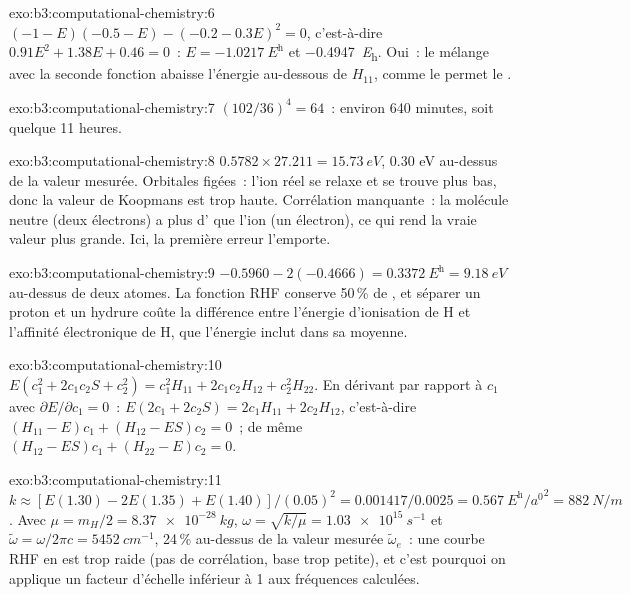 \begin{solution}{exo:b3:computational-chemistry:6}
$(-1 - E)(-0.5 - E) - (-0.2 - 0.3E)^2 = 0$, c'est-à-dire $0.91E^2 + 1.38E + 0.46 = 0$~:
$E = \qty{-1.0217}{\hartree}$ et \qty{-0.4947}{\hartree}. Oui~: le
mélange avec la seconde fonction abaisse l'énergie au-dessous de
$H_{11}$, comme le permet le .
\end{solution}

\begin{solution}{exo:b3:computational-chemistry:7}
$(102/36)^4 = 64$~: environ 640 minutes, soit quelque 11 heures.
\end{solution}

\begin{solution}{exo:b3:computational-chemistry:8}
$0.5782 \times 27.211 = \qty{15.73}{eV}$, 0.30 eV au-dessus de la valeur
mesurée. Orbitales figées~: l'ion réel se relaxe et se trouve plus bas,
donc la valeur de Koopmans est trop haute. Corrélation manquante~: la
molécule neutre (deux électrons) a plus d' que
l'ion (un électron), ce qui rend la vraie valeur plus grande. Ici, la
première erreur l'emporte.
\end{solution}

\begin{solution}{exo:b3:computational-chemistry:9}
$-0.5960 - 2(-0.4666) = \qty{0.3372}{\hartree} = \qty{9.18}{eV}$ au-dessus
de deux atomes. La fonction RHF conserve 50\,\% de , et séparer
un proton et un hydrure coûte la différence entre l'énergie d'ionisation
de H et l'affinité électronique de H, que l'énergie inclut dans sa
moyenne.
\end{solution}

\begin{solution}{exo:b3:computational-chemistry:10}
$E(c_1^2 + 2c_1c_2S + c_2^2) = c_1^2H_{11} + 2c_1c_2H_{12} + c_2^2H_{22}$.
En dérivant par rapport à $c_1$ avec $\partial E/\partial c_1 = 0$~:
$E(2c_1 + 2c_2S) = 2c_1H_{11} + 2c_2H_{12}$, c'est-à-dire $(H_{11} - E)c_1 + (H_{12} -
ES)c_2 = 0$~; de même $(H_{12} - ES)c_1 + (H_{22} - E)c_2 = 0$.
\end{solution}

\begin{solution}{exo:b3:computational-chemistry:11}
$k \approx [E(1.30) - 2E(1.35) + E(1.40)]/(0.05)^2 = 0.001417/0.0025 =
\qty{0.567}{\hartree\per\bohr\squared} = \qty{882}{N/m}$. Avec $\mu = m_H/2 =
\qty{8.37e-28}{kg}$, $\omega = \sqrt{k/\mu} = \qty{1.03e15}{s^{-1}}$ et
$\tilde\omega = \omega/2\pi c = \qty{5452}{cm^{-1}}$, 24\,\% au-dessus de
la valeur mesurée
$\tilde\omega_e$~: une courbe RHF en  est trop raide (pas de
corrélation, base trop petite), et c'est pourquoi on applique un facteur
d'échelle inférieur à 1 aux fréquences calculées.
\end{solution}

